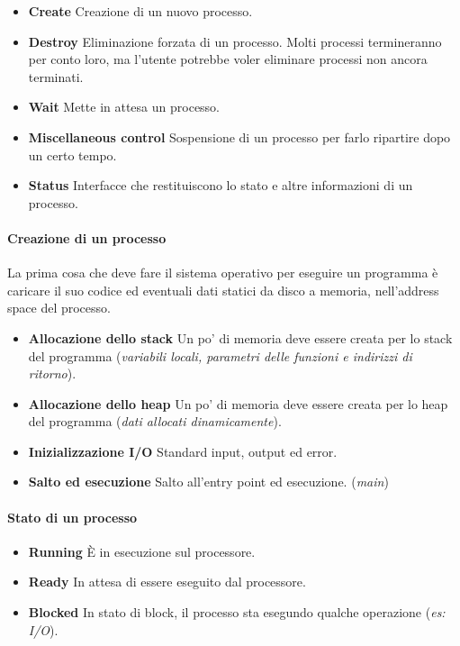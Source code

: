 \documentclass[12pt, letterpaper]{article}
\begin{document}
				\begin{itemize}
					\item \textbf{Create} Creazione di un nuovo processo.
					\item \textbf{Destroy} Eliminazione forzata di un processo. Molti processi termineranno per conto loro, ma l'utente potrebbe voler eliminare processi non ancora terminati.
					\item \textbf{Wait} Mette in attesa un processo. 
					\item \textbf{Miscellaneous control} Sospensione di un processo per farlo ripartire dopo un certo tempo.
					\item \textbf{Status} Interfacce che restituiscono lo stato e altre informazioni di un processo.
				\end{itemize}
				
				\paragraph{Creazione di un processo} La prima cosa che deve fare il sistema operativo per eseguire un programma è caricare il suo codice ed eventuali dati statici da disco a memoria, nell'address space del processo.
					\begin{itemize}
						\item \textbf{Allocazione dello stack} Un po' di memoria deve essere creata per lo stack del programma 	(\textit{variabili locali, parametri delle funzioni e indirizzi di ritorno}).	
						\item \textbf{Allocazione dello heap}  Un po' di memoria deve essere creata per lo heap del programma (\textit{dati allocati dinamicamente}).
						\item \textbf{Inizializzazione I/O} Standard input, output ed error.
						\item \textbf{Salto ed esecuzione} Salto all'entry point ed esecuzione. (\textit{main}) 
					\end{itemize}
					
				\paragraph{Stato di un processo}		
					\begin{itemize}
						\item \textbf{Running} È in esecuzione sul processore.
						\item \textbf{Ready} In attesa di essere eseguito dal processore.
						\item \textbf{Blocked} In stato di block, il processo sta esegundo qualche operazione (\textit{es: I/O}).
					\end{itemize}
					
\end{document}
